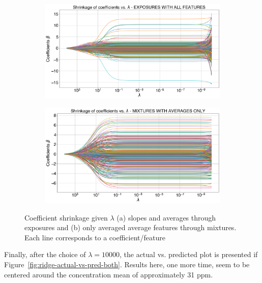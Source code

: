\begin{figure}[!htb]
	\centering
	
	\begin{subfigure}[t]{0.6\textwidth}
		\includegraphics[width=1\linewidth]{../figures/ridge-shrink.png}
		\caption{}
		\label{fig:ridge-shrink} 
	\end{subfigure}
	
	\begin{subfigure}[t]{0.6\textwidth}
		\includegraphics[width=1\linewidth]{../figures/ridge-shrink-avg-feat.png}
		\caption{}
		\label{fig:ridge-shrink-avg-feat}
	\end{subfigure}
	
	\caption{Coefficient shrinkage given $\lambda$ (a) slopes and averages through exposures and (b) only averaged average features through mixtures. Each line corresponds to a coefficient/feature}

	\label{fig:ridge-shrink-both}
\end{figure}

\clearpage
Finally, after the choice of $\lambda = 10000$, the actual vs. predicted plot is presented if Figure~\ref{fig:ridge-actual-vs-pred-both}. Results here, one more time, seem to be centered around the concentration mean of approximately 31 \acrshort{ppm}.

